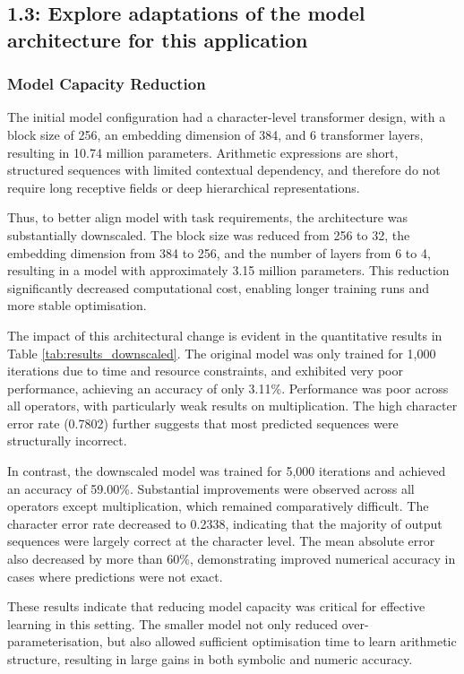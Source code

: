 \subsection{1.3: Explore adaptations of the model architecture for this application}

\subsubsection{Model Capacity Reduction}

The initial model configuration had a character-level transformer design, with a block size of 256, an embedding dimension of 384, and 6 transformer layers, resulting in 10.74 million parameters. Arithmetic expressions are short, structured sequences with limited contextual dependency, and therefore do not require long receptive fields or deep hierarchical representations.

Thus, to better align model with task requirements, the architecture was substantially downscaled. The block size was reduced from 256 to 32, the embedding dimension from 384 to 256, and the number of layers from 6 to 4, resulting in a model with approximately 3.15 million parameters. This reduction significantly decreased computational cost, enabling longer training runs and more stable optimisation. 

The impact of this architectural change is evident in the quantitative results in Table \ref{tab:results_downscaled}. The original model was only trained for 1,000 iterations due to time and resource constraints, and exhibited very poor performance, achieving an accuracy of only 3.11\%. Performance was poor across all operators, with particularly weak results on multiplication. The high character error rate (0.7802) further suggests that most predicted sequences were structurally incorrect.

In contrast, the downscaled model was trained for 5,000 iterations and achieved an accuracy of 59.00\%. Substantial improvements were observed across all operators except multiplication, which remained comparatively difficult. The character error rate decreased to 0.2338, indicating that the majority of output sequences were largely correct at the character level. The mean absolute error also decreased by more than 60\%, demonstrating improved numerical accuracy in cases where predictions were not exact.

These results indicate that reducing model capacity was critical for effective learning in this setting. The smaller model not only reduced over-parameterisation, but also allowed sufficient optimisation time to learn arithmetic structure, resulting in large gains in both symbolic and numeric accuracy.

